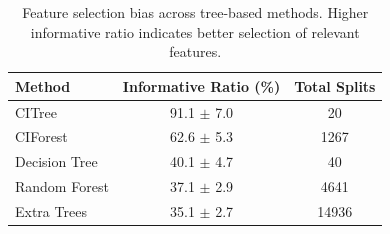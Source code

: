 \begin{table}[h]
\centering
\caption{Feature selection bias across tree-based methods. Higher informative ratio indicates better selection of relevant features.}
\label{tab:feature_selection_bias}
\begin{tabular}{lcc}
\toprule
Method & Informative Ratio (\%) & Total Splits \\
\midrule
CITree & 91.1 $\pm$ 7.0 & 20 \\
CIForest & 62.6 $\pm$ 5.3 & 1267 \\
Decision Tree & 40.1 $\pm$ 4.7 & 40 \\
Random Forest & 37.1 $\pm$ 2.9 & 4641 \\
Extra Trees & 35.1 $\pm$ 2.7 & 14936 \\
\bottomrule
\end{tabular}
\end{table}
